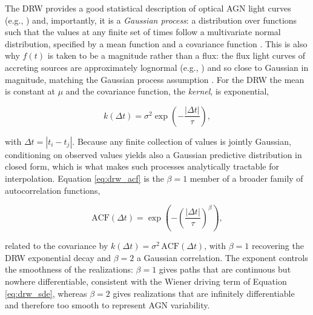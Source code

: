 The DRW provides a good statistical description of optical AGN light curves (e.g., \cites{Kelly2009ThermalFluc}{Wilkins2019GPDRW}{McLaughlin2024GPDRW}) and, importantly, it is a \textit{Gaussian process}: a distribution over functions such that the values at any finite set of times follow a multivariate normal distribution, specified by a mean function and a covariance function \parencite{Rasmussen2006GP}. This is also why $f(t)$ is taken to be a magnitude rather than a flux: the flux light curves of accreting sources are approximately lognormal (e.g., \cites{Giebels2009LogNormalVar}{deCicco2022SFshape}) and so close to Gaussian in magnitude, matching the Gaussian process assumption \parencite{Yu2025ScalableEztao}. For the DRW the mean is constant at $\mu$ and the covariance function, the \textit{kernel}, is exponential, %

\begin{equation}
    \label{eq:drw_acf}
    k(\Delta t) = \sigma^{2}\exp\!\left(-\frac{|\Delta t|}{\tau}\right),
\end{equation} 

with $\Delta t = |t_i - t_j|$. Because any finite collection of values is jointly Gaussian, conditioning on observed values yields also a Gaussian predictive distribution in closed form, which is what makes such processes analytically tractable for interpolation. Equation \ref{eq:drw_acf} is the $\beta = 1$ member of a broader family of autocorrelation functions,

\begin{equation}
    \label{eq:acf_family}
    \mathrm{ACF}(\Delta t) = \exp\!\left(-\left(\frac{|\Delta t|}{\tau}\right)^{\!\beta}\right),
\end{equation}

related to the covariance by $k(\Delta t) = \sigma^{2}\,\mathrm{ACF}(\Delta t)$, with $\beta = 1$ recovering the DRW exponential decay and $\beta = 2$ a Gaussian correlation. The exponent controls the smoothness of the realizations: $\beta = 1$ gives paths that are continuous but nowhere differentiable, consistent with the Wiener driving term of Equation \ref{eq:drw_sde}, whereas $\beta = 2$ gives realizations that are infinitely differentiable and therefore too smooth to represent AGN variability. 


